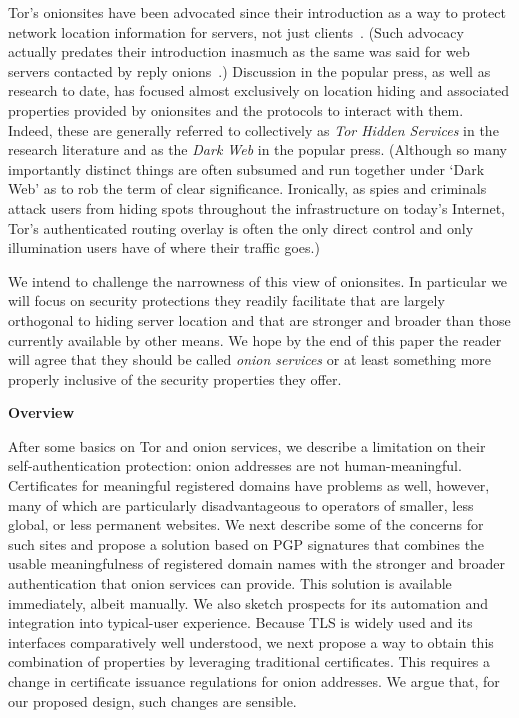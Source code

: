 \documentclass[10pt]{styles/IEEEtran}
\newcommand{\point}[1]{\vspace{2mm} \noindent\textbf{#1}}
\begin{document}
Tor's onionsites have been advocated since their introduction as a way
to protect network location information for servers, not just
clients~\cite{tor-design}. (Such advocacy actually predates their
introduction inasmuch as the same was said for web servers contacted
by reply onions~\cite{onion-routing:cacm99}.)
Discussion in the popular press, as well as research to
date, has focused almost exclusively on location hiding and associated
properties provided by onionsites and the protocols to interact with
them. Indeed, these are generally referred to collectively as
\emph{Tor Hidden Services} in the research literature and as the
\emph{Dark Web} in the popular press. (Although so many importantly
distinct things are often subsumed and run together under `Dark Web'
as to rob the term of clear significance.
Ironically, as spies and criminals attack users from hiding spots
throughout the infrastructure on today's Internet, Tor's
authenticated routing overlay is often the only direct control and
only illumination users have of where their traffic goes.)

We intend to challenge the narrowness of this view of
onionsites. In particular we will focus on security protections they
readily facilitate that are largely orthogonal to hiding server
location and that are stronger and broader than those currently
available by other means. We hope by the end of this paper the reader
will agree that they should be called \emph{onion services} or at
least something more properly inclusive of the security properties
they offer.

\point{Overview}

After some basics on Tor and onion services, we
describe a limitation on their self-authentication protection: onion
addresses are not human-meaningful. Certificates for meaningful
registered domains have problems as well, however, many of which are
particularly disadvantageous to operators of smaller, less global, or
less permanent websites.  We next describe some of the concerns for
such sites and propose a solution based on PGP signatures that
combines the usable meaningfulness of registered domain names with the
stronger and broader authentication that onion services can
provide.  This solution is available immediately, albeit manually.
We also sketch prospects for its automation and integration
into typical-user experience.
Because TLS is widely used and its interfaces comparatively well
understood, we next propose a way to obtain this
combination of properties by leveraging traditional certificates.
This requires a change in certificate issuance regulations for onion
addresses.  We argue that, for our proposed design, such changes are
sensible.
\end{document}
